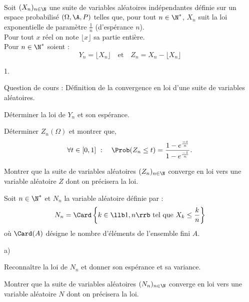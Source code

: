 \documentclass[11pt]{article}%
\begin{document}
\begin{exerciceAP}~\\
  Soit $(X_n)_{n \in \N}$ une suite de variables aléatoires
  indépendantes définie sur un espace probabilisé $(\Omega ,
  \A , P)$ telles que, pour tout $n \in \N^*$, $X_n$
  suit la loi exponentielle de paramètre $\frac{1}{n}$ (d'espérance
  $n$).\\
  Pour tout $x$ réel on note $\lfloor x \rfloor$ sa partie entière. \\
  Pour $n \in \N^*$ soient :
  \[
  Y_n = \lfloor X_n \rfloor \ \ \ \text{ et } \ \ \ Z_n = X_n -
  \lfloor X_n \rfloor
  \]
  \begin{noliste}{1.}
    \setlength{\itemsep}{2mm}
  \item Question de cours : Définition de la convergence en loi d'une
    suite de variables aléatoires.
  \item Déterminer la loi de $Y_n$ et son espérance.
  \item Déterminer $Z_n (\Omega)$ et montrer que,
    \[
    \forall t \in [ 0 , 1]\ :\ \ \ \Prob(Z_n \leq t) = \frac{ 1 -
      e^{\frac{-t}{n} } }{1 - e^{\frac{-1}{n}}}.
    \]
  \item Montrer que la suite de variables aléatoires $(Z_n)_{ n \in
      \N}$ converge en loi vers une variable aléatoire $Z$ dont on
    précisera la loi.
  \item Soit $n \in \N^*$ et $N_n$ la variable aléatoire définie
    par :
    \[
    N_n = \Card \left\{ k \in \llb 1 , n \rrb \text{ tel que } X_k
      \leq \frac{k}{n} \right\}
    \]
    où $\Card (A)$ désigne le nombre d'éléments de l'ensemble fini $A$.
    \begin{noliste}{a)}
    \setlength{\itemsep}{2mm} \item Reconnaître la loi de $N_n$ et donner
      son espérance et sa variance.
    \item Montrer que la suite de variables aléatoires $(N_n)_{n \in
        \N}$ converge en loi vers une variable aléatoire $N$ dont on
      précisera la loi.
    \end{noliste} 
  \end{noliste}
\end{exerciceAP}

\end{document}
